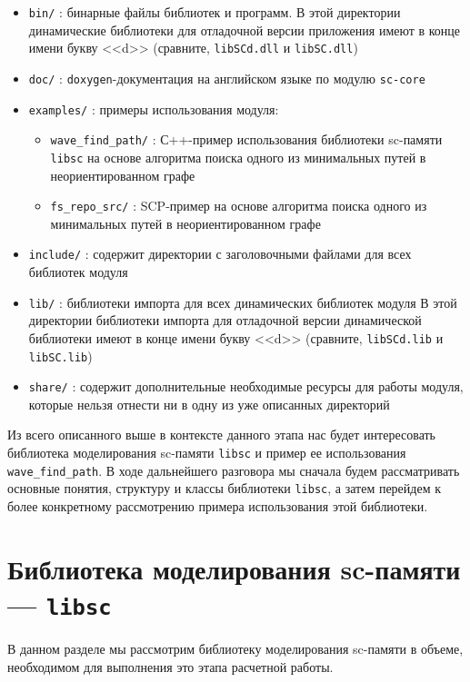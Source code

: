 \begin{itemize}
\item \verb|bin/| : бинарные файлы библиотек и программ. В этой
  директории динамические библиотеки для отладочной версии приложения
  имеют в конце имени букву <<d>> (сравните, \texttt{libSCd.dll} и
  \texttt{libSC.dll})
\item \verb|doc/| : \texttt{doxygen}-документация на английском языке
  по модулю \texttt{sc-core}
\item \verb|examples/| : примеры использования модуля:
  \begin{itemize}
  \item \verb|wave_find_path/| : С++-пример использования библиотеки
    sc-памяти \texttt{libsc} на основе алгоритма поиска одного из
    минимальных путей в неориентированном графе
  \item \verb|fs_repo_src/| : SCP-пример на основе алгоритма поиска
    одного из минимальных путей в неориентированном графе
  \end{itemize}
\item \verb|include/| : содержит директории с заголовочными файлами
  для всех библиотек модуля
\item \verb|lib/| : библиотеки импорта для всех динамических библиотек
  модуля В этой директории библиотеки импорта для отладочной версии
  динамической библиотеки имеют в конце имени букву <<d>> (сравните,
  \texttt{libSCd.lib} и \texttt{libSC.lib})
\item \verb|share/| : содержит дополнительные необходимые ресурсы для
  работы модуля, которые нельзя отнести ни в одну из уже описанных
  директорий
\end{itemize}

Из всего описанного выше в контексте данного этапа нас будет
интересовать библиотека моделирования sc-памяти \texttt{libsc} и
пример ее использования \verb|wave_find_path|. В ходе дальнейшего
разговора мы сначала будем рассматривать основные понятия, структуру и
классы библиотеки \texttt{libsc}, а затем перейдем к более конкретному
рассмотрению примера использования этой библиотеки.

\section{Библиотека моделирования sc-памяти --- \texttt{libsc}}
\label{sec:libsc}

В данном разделе мы рассмотрим библиотеку моделирования sc-памяти в
объеме, необходимом для выполнения это этапа расчетной работы.

